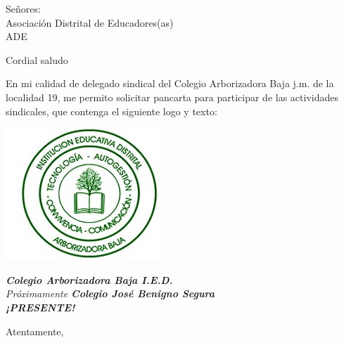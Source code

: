 \documentclass[letterpaper,spanish]{letter}
\begin{document}
\begin{letter}{Señores:\\Asociación Distrital de Educadores(as)\\ADE}
	
\opening{Cordial saludo}
En mi calidad de delegado sindical del Colegio Arborizadora Baja j.m. de la localidad 19, me permito solicitar pancarta para participar de las actividades sindicales, que contenga el  siguiente logo y texto:

\begin{center}
\includegraphics[scale=.5]{Images/logo-colegio.jpg}
\end{center}

\begin{center}
\emph{\textbf{Colegio Arborizadora Baja I.E.D.}\\
Próximamente \textbf{Colegio José Benigno Segura}
\\\textbf{¡PRESENTE!}}
\end{center}

\closing{Atentamente,}

\end{letter}
\end{document}
